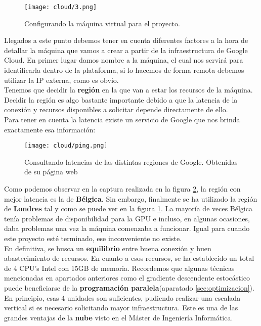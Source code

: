 \documentclass[11pt,fleqn]{book} %
\begin{document}
\begin{figure}[H]
	\centering\texttt{[image: cloud/3.png]}
	\caption{Configurando la máquina virtual para el proyecto.}
	\label{fig:cloud3} %
\end{figure}

Llegados a este punto debemos tener en cuenta diferentes factores a la hora de detallar la máquina que vamos a crear a partir de la infraestructura de Google Cloud. En primer lugar damos nombre a la máquina, el cual nos servirá para identificarla dentro de la plataforma, si lo hacemos de forma remota debemos utilizar la IP externa, como es obvio. \\

Tenemos que decidir la \textbf{región} en la que van a estar los recursos de la máquina. Decidir la región es algo bastante importante debido a que la latencia de la conexión y recursos disponibles a solicitar depende directamente de ello. \\

Para tener en cuenta la latencia existe un servicio de Google que nos brinda exactamente esa información:

\begin{figure}[H]
	\centering\texttt{[image: cloud/ping.png]}
	\caption{Consultando latencias de las distintas regiones de Google. Obtenidas de su página web \cite{article:ping}}
	\label{fig:cloudping} %
\end{figure}

Como podemos observar en la captura realizada en la figura \ref{fig:cloudping}, la región con mejor latencia es la de \textbf{Bélgica}. Sin embargo, finalmente se ha  utilizado la región de \textbf{Londres} tal y como se puede ver en la figura \ref{fig:cloud3}. La mayoría de veces Bélgica tenía problemas de disponibilidad para la GPU e incluso, en algunas ocasiones, daba problemas una vez la máquina comenzaba a funcionar. Igual para cuando este proyecto esté terminado, ese inconveniente no existe. \\

En definitiva, se busca un \textbf{equilibrio} entre buena conexión y buen abastecimiento de recursos. En cuanto a esos recursos, se ha establecido un total de 4 CPU's Intel con 15GB de memoria. Recordemos que algunas técnicas mencionadas en apartados anteriores como el gradiente descendente estocástico puede beneficiarse de la \textbf{programación paralela}(aparatado \ref{sec:optimizacion}). En principio,  esas 4 unidades son suficientes, pudiendo realizar una escalada vertical si es necesario solicitando mayor infraestructura. Este es una de las grandes ventajas de la \textbf{nube} visto en el Máster de Ingeniería Informática. \\
\end{document}
